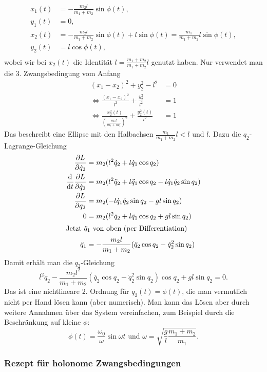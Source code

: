 \begin{beispiel*}
	\begin{align*}
		x_1(t) &= - \frac{m_2 l}{m_1 + m_2} \sin \phi(t), \\
		y_1(t) &= 0, \\
		x_2(t) &= - \frac{m_2 l}{m_1 + m_2} \sin \phi(t) + l \sin \phi(t) = \frac{m_1}{m_1 + m_2} l \sin \phi(t), \\
		y_2(t) &= l \cos \phi(t), \\
	\end{align*}
	wobei wir bei $x_2(t)$ die Identität $l = \frac{m_1 + m_2}{m_1 + m_2} l$ genutzt haben. Nur verwendet man die 3. Zwangsbedingung vom Anfang
	\begin{align*}
	(x_1 - x_2)^2 + y_2^2 - l^2 &= 0\\
	\Leftrightarrow \frac{(x_1 - x_2)^2}{l^2} + \frac{y_2^2}{l^2} &= 1\\ 
	\Leftrightarrow \frac{x_2^2(t)}{(\frac{m_1 l}{m_1 + m_2})^2} + \frac{y_2^2(t)}{l^2} &= 1
	\end{align*}
	Das beschreibt eine Ellipse mit den Halbachsen $\frac{m_1}{m_1 + m_2}l < l \text{~und~} l$.
	Dazu die $q_2$-Lagrange-Gleichung
	\begin{align*}
	\frac{\partial L}{\partial \dot{q}_2} &= m_2 (l^2 \dot{q}_2 + l \dot{q}_1 \cos q_2)\\
	\frac{\mathrm d}{\mathrm d t} \frac{\partial L}{\partial \dot{q}_2} &= m_2 (l^2 \ddot{q}_2 + l \ddot{q}_1 \cos q_2 - l \dot{q}_1 \dot{q}_2 \sin q_2)\\
	\frac{\partial L}{\partial q_2} &= m_2 (- l \dot{q}_1 \dot{q}_2 \sin q_2 - g l \sin q_2)\\
	0 &= m_2 (l^2 \ddot{q}_2 + l \ddot{q}_1 \cos q_2 + g l \sin q_2)\\
	\intertext{Jetzt $\ddot{q}_1$ von oben (per Differentiation)}
	\ddot{q}_1 &= - \frac{m_2 l}{m_1 + m_2} (\ddot{q}_2 \cos q_2 - \dot{q}_2^2 \sin q_2)
	\end{align*}
	Damit erhält man die $q_2$-Gleichung
	\[
		l^2 \ddot{q}_2 - \frac{m_2 l^2}{m_1 + m_2}(\ddot{q_2} \cos q_2 - \dot{q}_2^2 \sin q_2) \cos q_2 + g l \sin q_2 = 0
		\text{.}
	\]
	Das ist eine nichtlineare \Dgl{} 2. Ordnung für $q_2(t) = \phi(t)$, die man vermutlich nicht per Hand lösen kann (aber numerisch). Man kann das Lösen aber durch weitere Annahmen über das System vereinfachen, zum Beispiel durch die Beschränkung auf kleine $\phi$:
	\[
		\phi(t) = \frac{\omega_0}{\omega} \sin \omega t \text{~und~} \omega = \sqrt{\frac{g}{l} \frac{m_1 + m_2}{m_1}}
		\text{.}
	\]
\end{beispiel*}


\subsubsection{Rezept für holonome Zwangsbedingungen}

